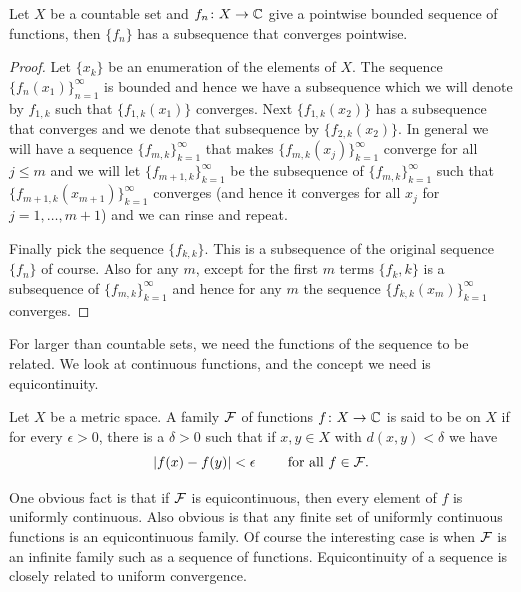 \begin{thm} \label{thm:subsequenceoncountableX}
Let $X$ be a countable set and $f_n \colon X \to {\mathbb{C}}$ give a pointwise bounded
sequence of functions, then $\{ f_n \}$ has a subsequence that converges
pointwise.
\end{thm}

\begin{proof}
Let $\{ x_k \}$ be an enumeration of the elements of $X$.
The sequence $\{ f_n(x_1) \}_{n=1}^\infty$ is bounded and hence
we have a subsequence which we will denote by
$f_{1,k}$ such that $\{ f_{1,k}(x_1) \}$ converges.
Next $\{ f_{1,k}(x_2) \}$ has a subsequence that converges and
we denote that subsequence by
$\{ f_{2,k}(x_2) \}$.  In general we will have a sequence $\{ f_{m,k}
\}_{k=1}^\infty$
that makes $\{ f_{m,k}(x_j) \}_{k=1}^\infty$ converge for all $j \leq m$ and we will
let $\{ f_{m+1,k} \}_{k=1}^\infty$ be the subsequence of $\{ f_{m,k}
\}_{k=1}^\infty$
such that
$\{ f_{m+1,k}(x_{m+1}) \}_{k=1}^\infty$ converges (and hence it converges for all
$x_j$ for $j=1,\ldots,m+1$) and we can rinse and repeat.

Finally pick the sequence
$\{ f_{k,k} \}$.  This is a subsequence of the original sequence $\{ f_n \}$
of course.  Also for any $m$,
except for the first $m$ terms $\{ f_k,k \}$ is a subsequence of $\{ f_{m,k}
\}_{k=1}^\infty$
and hence for any $m$ the sequence $\{ f_{k,k}(x_m) \}_{k=1}^\infty$ converges.
\end{proof}

For larger than countable sets,
we need the functions of the sequence to be related.  We look at
continuous functions, and the concept we need is equicontinuity.

\begin{defn}
Let $X$ be a metric space.
A family ${\mathcal{F}}$ of functions $f \colon X \to {\mathbb{C}}$ is said to be
\emph{} on $X$ if for every $\epsilon > 0$, there is a $\delta > 0$
such that if $x, y \in X$ with $d(x,y) < \delta$ we have
\begin{equation*}
\lvert {f(x)-f(y)} \rvert < \epsilon \qquad \text{ for all $f \in {\mathcal{F}}$} .
\end{equation*}
\end{defn}

One obvious fact is that if ${\mathcal{F}}$ is equicontinuous, then every element of
$f$ is uniformly continuous.  Also obvious is that any finite set of
uniformly continuous functions is an equicontinuous family.  Of course the
interesting case is when ${\mathcal{F}}$ is an infinite family such as a sequence of
functions.  Equicontinuity of a sequence
is closely related to uniform convergence.

